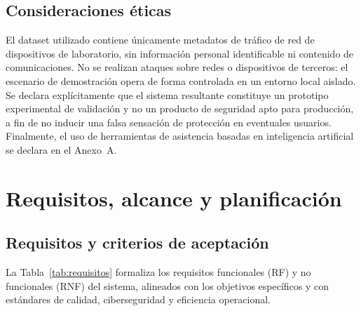 \documentclass[11pt,a4paper]{article}
\begin{document}
\subsection{Consideraciones éticas}
El dataset utilizado contiene únicamente metadatos de tráfico de red de dispositivos de laboratorio, sin información personal identificable ni contenido de comunicaciones. No se realizan ataques sobre redes o dispositivos de terceros: el escenario de demostración opera de forma controlada en un entorno local aislado. Se declara explícitamente que el sistema resultante constituye un prototipo experimental de validación y no un producto de seguridad apto para producción, a fin de no inducir una falsa sensación de protección en eventuales usuarios. Finalmente, el uso de herramientas de asistencia basadas en inteligencia artificial se declara en el Anexo~A.

\section{Requisitos, alcance y planificación}

\subsection{Requisitos y criterios de aceptación}
La Tabla~\ref{tab:requisitos} formaliza los requisitos funcionales (RF) y no funcionales (RNF) del sistema, alineados con los objetivos específicos y con estándares de calidad, ciberseguridad y eficiencia operacional.
\end{document}
